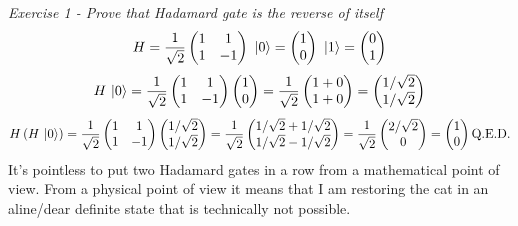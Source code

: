 \textit{Exercise 1 - Prove that Hadamard gate is the reverse of itself}\\
\[H=\frac{1}{\sqrt{2}}\begin{pmatrix}1&1\\1&-1\end{pmatrix}\,\,\ket{0}=\begin{pmatrix}1\\0\end{pmatrix}\,\,\ket{1}=\begin{pmatrix}0\\1\end{pmatrix}\]
\[H\,\ket{0}=\frac{1}{\sqrt{2}}\begin{pmatrix}1&1\\1&-1\end{pmatrix}\begin{pmatrix}1\\0\end{pmatrix}=\frac{1}{\sqrt{2}}\begin{pmatrix}1+0\\1+0\end{pmatrix}=\begin{pmatrix}1/\sqrt{2}\\1/\sqrt{2}\end{pmatrix}\]
\[
H\,(H\,\ket{0})=\frac{1}{\sqrt{2}}\begin{pmatrix}1&1\\1&-1\end{pmatrix}\begin{pmatrix}1/\sqrt{2}\\1/\sqrt{2}\end{pmatrix}=\frac{1}{\sqrt{2}}\begin{pmatrix}1/\sqrt{2}+1/\sqrt{2}\\1/\sqrt{2}-1/\sqrt{2}\end{pmatrix}=\frac{1}{\sqrt{2}}\begin{pmatrix}2/\sqrt{2}\\0\end{pmatrix}=\begin{pmatrix}1\\0\end{pmatrix} \text{Q.E.D.}\]
It's pointless to put two Hadamard gates in a row from a mathematical point of view. From a physical point of view it means that I am restoring the cat in an aline/dear definite state that is technically not possible.\\
\newline

